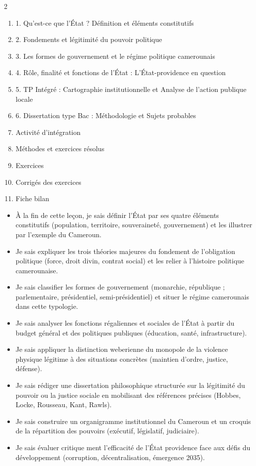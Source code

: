 \documentclass[11pt]{article}
\begin{document}
\begin{sommaire}
\begin{multicols}{2}
\begin{enumerate}
\item 1. Qu'est-ce que l'État ? Définition et éléments constitutifs
\item 2. Fondements et légitimité du pouvoir politique
\item 3. Les formes de gouvernement et le régime politique camerounais
\item 4. Rôle, finalité et fonctions de l'État : L'État-providence en question
\item 5. TP Intégré : Cartographie institutionnelle et Analyse de l'action publique locale
\item 6. Dissertation type Bac : Méthodologie et Sujets probables
\item Activité d'intégration
\item Méthodes et exercices résolus
\item Exercices
\item Corrigés des exercices
\item Fiche bilan
\end{enumerate}
\end{multicols}
\end{sommaire}

\begin{objectifs}
\begin{itemize}
\item À la fin de cette leçon, je sais définir l'État par ses quatre éléments constitutifs (population, territoire, souveraineté, gouvernement) et les illustrer par l'exemple du Cameroun.
\item Je sais expliquer les trois théories majeures du fondement de l'obligation politique (force, droit divin, contrat social) et les relier à l'histoire politique camerounaise.
\item Je sais classifier les formes de gouvernement (monarchie, république ; parlementaire, présidentiel, semi-présidentiel) et situer le régime camerounais dans cette typologie.
\item Je sais analyser les fonctions régaliennes et sociales de l'État à partir du budget général et des politiques publiques (éducation, santé, infrastructure).
\item Je sais appliquer la distinction weberienne du monopole de la violence physique légitime à des situations concrètes (maintien d'ordre, justice, défense).
\item Je sais rédiger une dissertation philosophique structurée sur la légitimité du pouvoir ou la justice sociale en mobilisant des références précises (Hobbes, Locke, Rousseau, Kant, Rawls).
\item Je sais construire un organigramme institutionnel du Cameroun et un croquis de la répartition des pouvoirs (exécutif, législatif, judiciaire).
\item Je sais évaluer critique ment l'efficacité de l'État providence face aux défis du développement (corruption, décentralisation, émergence 2035).
\end{itemize}
\end{objectifs}
\end{document}
